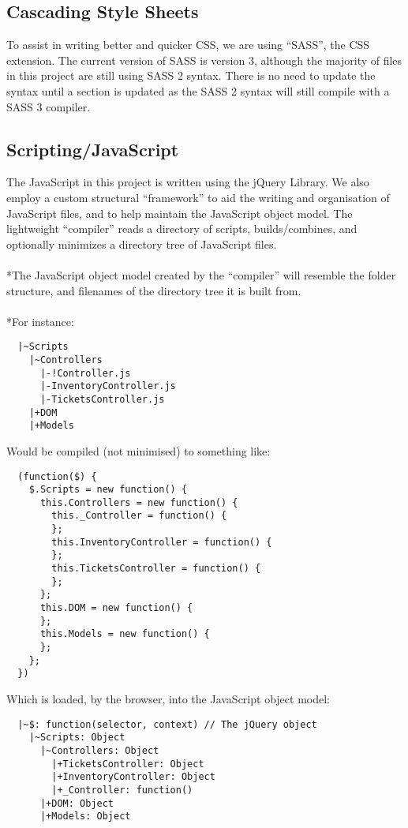 \documentclass{article}
\begin{document}
\subsection{Cascading Style Sheets}
To assist in writing better and quicker CSS, we are using ``SASS'', the CSS extension. The current version of SASS is version 3, although the majority of files in this project are still using SASS 2 syntax. There is no need to update the syntax until a section is updated as the SASS 2 syntax will still compile with a SASS 3 compiler.
\subsection{Scripting/JavaScript}
The JavaScript in this project is written using the jQuery Library. We also employ a custom structural ``framework'' to aid the writing and organisation of JavaScript files, and to help maintain the JavaScript object model. The lightweight ``compiler'' reads a directory of scripts, builds/combines, and optionally minimizes a directory tree of JavaScript files.\\
\\*The JavaScript object model created by the ``compiler'' will resemble the folder structure, and filenames of the directory tree it is built from.\\
\\*For instance:
\begin{lstlisting}
  |~Scripts
    |~Controllers
      |-!Controller.js
      |-InventoryController.js
      |-TicketsController.js
    |+DOM
    |+Models
\end{lstlisting}
Would be compiled (not minimised) to something like: %
\begin{lstlisting}
  (function($) { 
    $.Scripts = new function() {
      this.Controllers = new function() {
        this._Controller = function() {
        };
        this.InventoryController = function() {
        };
        this.TicketsController = function() {
        };
      };
      this.DOM = new function() {
      };
      this.Models = new function() {
      };
    };
  })
\end{lstlisting}
Which is loaded, by the browser, into the JavaScript object model:
\begin{lstlisting}
  |~$: function(selector, context) // The jQuery object
    |~Scripts: Object
      |~Controllers: Object
        |+TicketsController: Object
        |+InventoryController: Object
        |+_Controller: function()
      |+DOM: Object
      |+Models: Object
\end{lstlisting}
    
\end{document}
